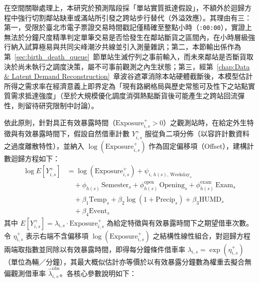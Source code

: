 在空間關聯處理上，本研究於預測階段採「單站實質抵達假設」，不額外於迴歸方程中強行切割鄰站缺車或滿站所引發之跨站步行替代（外溢效應）。其理由有三：第一，受限於臺北市電子票證交易時間戳記僅精確至整點小時（\texttt{:00:00}），實證上無法於分鐘尺度精準判定單筆交易是否恰發生在鄰站斷貨之區間內，在小時層級強行納入試算極易與共同尖峰潮汐共線並引入測量雜訊；第二，本節輸出係作為第~\ref{sec:birth_death_queue}~節單站生滅佇列之事前輸入，而未來鄰站是否斷貨取決於尚未執行之調度決策，屬不可事前觀測之內生狀態；第三，經第~\ref{chap:Data & Latent Demand Reconstruction}~章波谷遮罩消除本站硬體截斷後，本模型估計所得之需求率在經濟意義上即界定為「現有路網格局與歷史常態可及性下之站點實質需求抵達強度」（至於大規模優化調度消弭熱點斷貨後可能產生之跨站回流彈性，則留待研究限制中討論）。

依此原則，針對具正有效暴露時間（$\text{Exposure}^+_{i,s} > 0$）之觀測站時，在給定外生特徵與有效暴露時間下，假設自然借車計數 $Y^+_{i,s}$ 服從負二項分佈（以容許計數資料之過度離散特性），並納入 $\log(\text{Exposure}^+_{i,s})$ 作為固定偏移項（Offset），建構計數迴歸方程如下：
\begin{equation}
\boxed{
\begin{aligned}
\log E\!\left[Y^+_{i,s}\right] &= \log\!\left(\text{Exposure}^+_{i,s}\right) + \psi_{i,\, h(s),\, \text{Weekday}_s} \\
& \quad + \phi_{h(s)} \, \text{Semester}_s + \phi^{\text{open}}_{h(s)} \, \text{Opening}_s + \phi^{\text{exam}}_{h(s)} \, \text{Exam}_s \\
& \quad + \beta_1 \text{Temp}_s + \beta_2 \log\!\left(1 + \text{Precip}_s\right) + \beta_3 \text{HUMD}_s \\
& \quad + \beta_4 \text{Event}_s
\end{aligned}
}
\end{equation}
其中 $E\left[Y^+_{i,s}\right] = \lambda_{i,s} \cdot \text{Exposure}^+_{i,s}$ 為給定特徵與有效暴露時間下之期望借車次數。令 $\eta^+_{i,s}$ 表示右端不含偏移項 $\log(\text{Exposure}^+_{i,s})$ 之結構性線性組合，對迴歸方程兩端取指數並同除以有效暴露時間，即得每分鐘條件借車率 $\lambda_{i,s} = \exp(\eta^+_{i,s})$（單位為輛／分鐘），其最大概似估計亦等價於以有效暴露分鐘數為權重去擬合無偏觀測借車率 $\hat{\lambda}^{\text{obs}}_{i,s}$。各核心參數說明如下：
